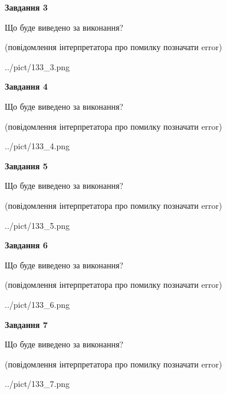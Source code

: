 \documentclass[12pt, ukrainian]{article}
\begin{document}
{\begin {large}
{\begin {center}\textbf{Завдання 3}\end {center}}\par
Що буде виведено за виконання?\par
 (повідомлення інтерпретатора про помилку позначати error)\par
\begin{center}
	{../pict/133_3.png}
\end{center}
\newpage

{\begin {center}\textbf{Завдання 4}\end {center}}\par
Що буде виведено за виконання?\par
 (повідомлення інтерпретатора про помилку позначати error)\par
\begin{center}
	{../pict/133_4.png}
\end{center}
\newpage

{\begin {center}\textbf{Завдання 5}\end {center}}\par
Що буде виведено за виконання?\par
 (повідомлення інтерпретатора про помилку позначати error)\par
\begin{center}
	{../pict/133_5.png}
\end{center}
\newpage

{\begin {center}\textbf{Завдання 6}\end {center}}\par
Що буде виведено за виконання?\par
 (повідомлення інтерпретатора про помилку позначати error)\par
\begin{center}
	{../pict/133_6.png}
\end{center}
\newpage

{\begin {center}\textbf{Завдання 7}\end {center}}\par
Що буде виведено за виконання?\par
 (повідомлення інтерпретатора про помилку позначати error)\par
\begin{center}
	{../pict/133_7.png}
\end{center}
\newpage


\end{large}}
\end{document}
